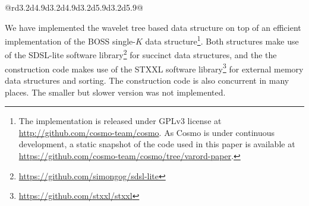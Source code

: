 \begin{mytable}[t!]
\begin{tabular}{@{}rd{3.2}d{4.9}d{3.2}d{4.9}d{3.2}d{5.9}d{3.2}d{5.9}@{}}

\bottomrule
\end{tabular}
\label{tab:nav-time}
\end{mytable}

We have implemented the wavelet tree based data structure on top of an efficient implementation of the BOSS single-$K$ data structure\footnote{The
implementation is released under GPLv3 license at \url{http://github.com/cosmo-team/cosmo}. As Cosmo is under continuous development,
a static snapshot of the code used in this paper is available at \url{https://github.com/cosmo-team/cosmo/tree/varord-paper}.}.
Both structures make use of the SDSL-lite software library\footnote{\url{https://github.com/simongog/sdsl-lite}} for succinct data structures, and the
the construction code makes use of the STXXL software library\footnote{\url{https://github.com/stxxl/stxxl}} for external memory data structures and sorting.
The construction code is also concurrent in many places.%
The smaller but slower version was not implemented.

